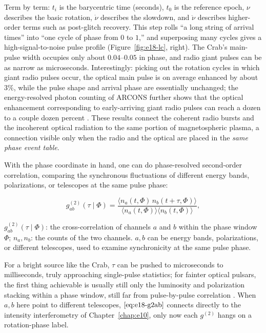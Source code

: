 Term by term: \(t_i\) is the barycentric time (seconds), \(t_0\) is the reference epoch, \(\nu\) describes the basic rotation, \(\dot\nu\) describes the slowdown, and \(\ddot\nu\) describes higher-order terms such as post-glitch recovery. This step rolls ``a long string of arrival times'' into ``one cycle of phase from \(0\) to \(1\),'' and superposing many cycles gives a high-signal-to-noise pulse profile (Figure~\ref{fig:e18-lc}, right). The Crab's main-pulse width occupies only about \(0.04\)--\(0.05\) in phase, and radio giant pulses can be as narrow as microseconds. Interestingly: picking out the rotation cycles in which giant radio pulses occur, the optical main pulse is on average enhanced by about \(3\%\), while the pulse shape and arrival phase are essentially unchanged; the energy-resolved photon counting of ARCONS further shows that the optical enhancement corresponding to early-arriving giant radio pulses can reach a dozen to a couple dozen percent \citep{2003Sci...301..493S,2013ApJ...779L..12S}. These results connect the coherent radio bursts and the incoherent optical radiation to the same portion of magnetospheric plasma, a connection visible only when the radio and the optical are placed in the \emph{same phase event table}.

With the phase coordinate in hand, one can do phase-resolved second-order correlation, comparing the synchronous fluctuations of different energy bands, polarizations, or telescopes at the same pulse phase:

\begin{equation}
  g^{(2)}_{ab}(\tau\mid\Phi)=
  \frac{\langle n_a(t,\Phi)\,n_b(t+\tau,\Phi)\rangle}
       {\langle n_a(t,\Phi)\rangle\langle n_b(t,\Phi)\rangle},
  \label{eq:e18-g2ab}
\end{equation}
\begin{formulaexplain}
\(g^{(2)}_{ab}(\tau\mid\Phi)\): the cross-correlation of channels \(a\) and \(b\) within the phase window \(\Phi\); \(n_a,n_b\): the counts of the two channels. \(a,b\) can be energy bands, polarizations, or different telescopes, used to examine synchronicity at the same pulse phase.
\end{formulaexplain}

For a bright source like the Crab, \(\tau\) can be pushed to microseconds to milliseconds, truly approaching single-pulse statistics; for fainter optical pulsars, the first thing achievable is usually still only the luminosity and polarization stacking within a phase window, still far from pulse-by-pulse correlation \citep{1996ApJ...468..779M,2000ApJ...537..861S,2009MNRAS.397..103S}. When \(a,b\) here point to different telescopes, \(\eqref{eq:e18-g2ab}\) connects directly to the intensity interferometry of Chapter~\ref{chap:e10}, only now each \(g^{(2)}\) hangs on a rotation-phase label.


